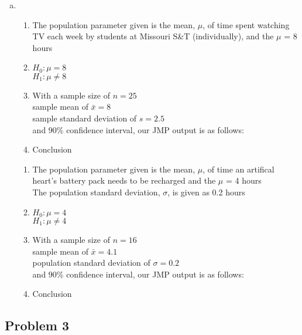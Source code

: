 \documentclass[14pt]{article}
\begin{document}
\begin{enumerate}[(a)]
\item
\begin{enumerate}[1.]
\item
The population parameter given is the mean, $\mu$, of time spent watching TV each week by students at Missouri S\&T (individually), and the $\mu$ = 8 hours

\item
$H_0 : \mu = 8$ \\
$H_1 : \mu \neq 8$

\item
With a sample size of $n = 25$ \\
sample mean of $\bar{x} = 8$ \\
sample standard deviation of $s = 2.5$ \\ 
and $90$\% confidence interval, our JMP output is as follows: \\

\item
Conclusion

\end{enumerate}
\begin{enumerate}[1.]

\item
The population parameter given is the mean, $\mu$, of time an artifical heart's battery pack needs to be recharged and the $\mu$ = 4 hours \\
The population standard deviation, $\sigma$, is given as 0.2 hours

\item
$H_0 : \mu = 4$ \\
$H_1 : \mu \neq 4$

\item
With a sample size of $n = 16$ \\
sample mean of $\bar{x} = 4.1$ \\
population standard deviation of $\sigma = 0.2$ \\ 
and $90$\% confidence interval, our JMP output is as follows: \\

\item
Conclusion

\end{enumerate}

\end{enumerate}

\subsection*{Problem 3}
\end{document}
